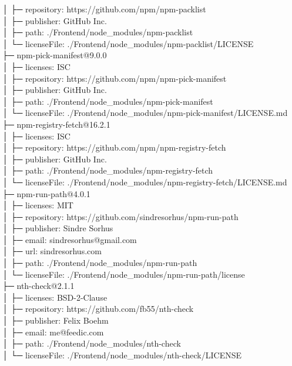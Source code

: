 │  ├─ repository: https://github.com/npm/npm-packlist\\
│  ├─ publisher: GitHub Inc.\\
│  ├─ path: ./Frontend/node\_modules/npm-packlist\\
│  └─ licenseFile: ./Frontend/node\_modules/npm-packlist/LICENSE\\
├─ npm-pick-manifest@9.0.0\\
│  ├─ licenses: ISC\\
│  ├─ repository: https://github.com/npm/npm-pick-manifest\\
│  ├─ publisher: GitHub Inc.\\
│  ├─ path: ./Frontend/node\_modules/npm-pick-manifest\\
│  └─ licenseFile: ./Frontend/node\_modules/npm-pick-manifest/LICENSE.md\\
├─ npm-registry-fetch@16.2.1\\
│  ├─ licenses: ISC\\
│  ├─ repository: https://github.com/npm/npm-registry-fetch\\
│  ├─ publisher: GitHub Inc.\\
│  ├─ path: ./Frontend/node\_modules/npm-registry-fetch\\
│  └─ licenseFile: ./Frontend/node\_modules/npm-registry-fetch/LICENSE.md\\
├─ npm-run-path@4.0.1\\
│  ├─ licenses: MIT\\
│  ├─ repository: https://github.com/sindresorhus/npm-run-path\\
│  ├─ publisher: Sindre Sorhus\\
│  ├─ email: sindresorhus@gmail.com\\
│  ├─ url: sindresorhus.com\\
│  ├─ path: ./Frontend/node\_modules/npm-run-path\\
│  └─ licenseFile: ./Frontend/node\_modules/npm-run-path/license\\
├─ nth-check@2.1.1\\
│  ├─ licenses: BSD-2-Clause\\
│  ├─ repository: https://github.com/fb55/nth-check\\
│  ├─ publisher: Felix Boehm\\
│  ├─ email: me@feedic.com\\
│  ├─ path: ./Frontend/node\_modules/nth-check\\
│  └─ licenseFile: ./Frontend/node\_modules/nth-check/LICENSE\\
